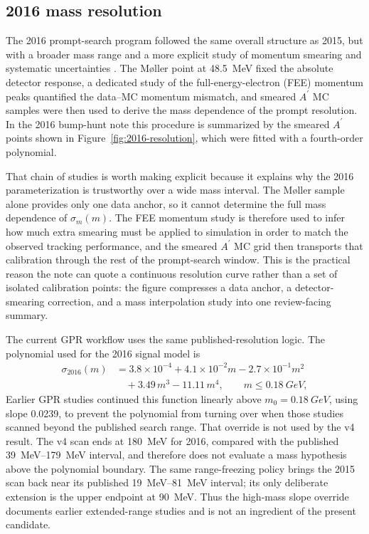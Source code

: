 \subsection{2016 mass resolution}
\label{sec:massres-2016}

The 2016 prompt-search program followed the same overall structure as 2015, but with a
broader mass range and a more explicit study of momentum smearing and systematic
uncertainties \cite{HPS2016BumpInternal,HPS2016PromptLong}. The M{\o}ller point at
\SI{48.5}{MeV} fixed the absolute detector response, a dedicated study of the
full-energy-electron (FEE)
momentum peaks quantified the data--MC momentum mismatch, and smeared $A^\prime$ MC
samples were then used to derive the mass dependence of the prompt resolution. In the
2016 bump-hunt note this procedure is summarized by the smeared $A^\prime$ points shown
in Figure~\ref{fig:2016-resolution}, which were fitted with a fourth-order polynomial.

That chain of studies is worth making explicit because it explains why the 2016
parameterization is trustworthy over a wide mass interval. The M{\o}ller sample alone
provides only one data anchor, so it cannot determine the full mass dependence of
$\sigma_m(m)$. The FEE momentum study is therefore used to infer how much extra
smearing must be applied to simulation in order to match the observed tracking
performance, and the smeared $A^\prime$ MC grid then transports that calibration
through the rest of the prompt-search window. This is the practical reason the note can
quote a continuous resolution curve rather than a set of isolated calibration points:
the figure compresses a data anchor, a detector-smearing correction, and a mass
interpolation study into one review-facing summary.

The current GPR workflow uses the same published-resolution logic. The polynomial used
for the 2016 signal model is
\begin{align}
\sigma_{2016}(m) &= 3.8\times10^{-4} + 4.1\times10^{-2}m - 2.7\times10^{-1}m^2 \nonumber\\
&\quad + 3.49\,m^3 - 11.11\,m^4,
\qquad m \le \SI{0.18}{GeV},
\label{eq:sigma2016}
\end{align}
Earlier GPR studies continued this function linearly above
$m_0=\SI{0.18}{GeV}$, using slope \num{0.0239}, to prevent the polynomial from turning
over when those studies scanned beyond the published search range. That override is
not used by the v4 result. The v4 scan ends at \SI{180}{MeV} for 2016, compared with
the published \SIrange{39}{179}{MeV} interval, and therefore does not evaluate a mass
hypothesis above the polynomial boundary. The same range-freezing policy brings the
2015 scan back near its published \SIrange{19}{81}{MeV} interval; its only deliberate
extension is the upper endpoint at \SI{90}{MeV}. Thus the high-mass slope override
documents earlier extended-range studies and is not an ingredient of the present
candidate.

